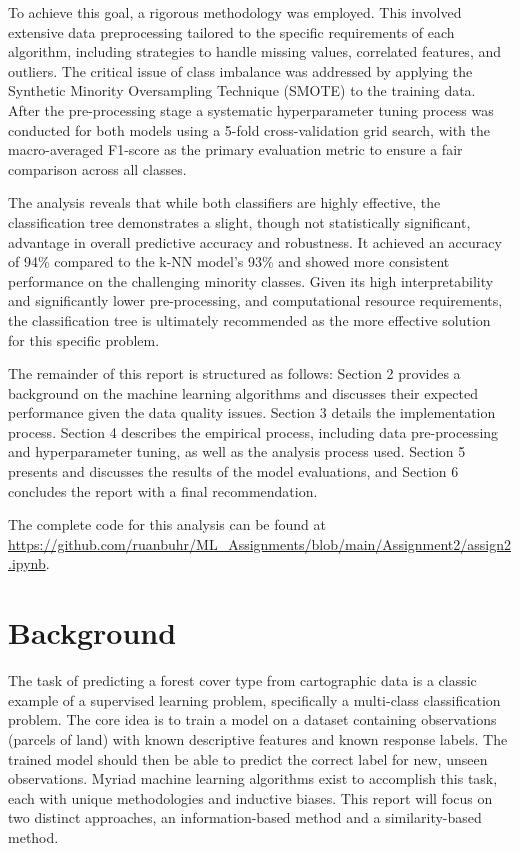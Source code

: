 \documentclass[conference]{IEEEtran}
\begin{document}
To achieve this goal, a rigorous methodology was employed. This involved extensive data preprocessing tailored to the specific requirements of each algorithm, including strategies to handle missing values, correlated features, and outliers. The critical issue of class imbalance was addressed by applying the Synthetic Minority Oversampling Technique (SMOTE) to the training data. After the pre-processing stage a systematic hyperparameter tuning process was conducted for both models using a 5-fold cross-validation grid search, with the macro-averaged F1-score as the primary evaluation metric to ensure a fair comparison across all classes.

The analysis reveals that while both classifiers are highly effective, the classification tree demonstrates a slight, though not statistically significant, advantage in overall predictive accuracy and robustness. It achieved an accuracy of 94\% compared to the k-NN model's 93\% and showed more consistent performance on the challenging minority classes. Given its high interpretability and significantly lower pre-processing, and computational resource requirements, the classification tree is ultimately recommended as the more effective solution for this specific problem.

The remainder of this report is structured as follows: Section 2 provides a background on the machine learning algorithms and discusses their expected performance given the data quality issues. Section 3 details the implementation process. Section 4 describes the empirical process, including data pre-processing and hyperparameter tuning, as well as the analysis process used. Section 5 presents and discusses the results of the model evaluations, and Section 6 concludes the report with a final recommendation.

The complete code for this analysis can be found at \url{https://github.com/ruanbuhr/ML_Assignments/blob/main/Assignment2/assign2.ipynb}.

\section{\textbf{Background}}

The task of predicting a forest cover type from cartographic data is a classic example of a supervised learning problem, specifically a multi-class classification problem. The core idea is to train a model on a dataset containing observations (parcels of land) with known descriptive features and known response labels. The trained model should then be able to predict the correct label for new, unseen observations. Myriad machine learning algorithms exist to accomplish this task, each with unique methodologies and inductive biases. This report will focus on two distinct approaches, an information-based method and a similarity-based method. 
\end{document}
